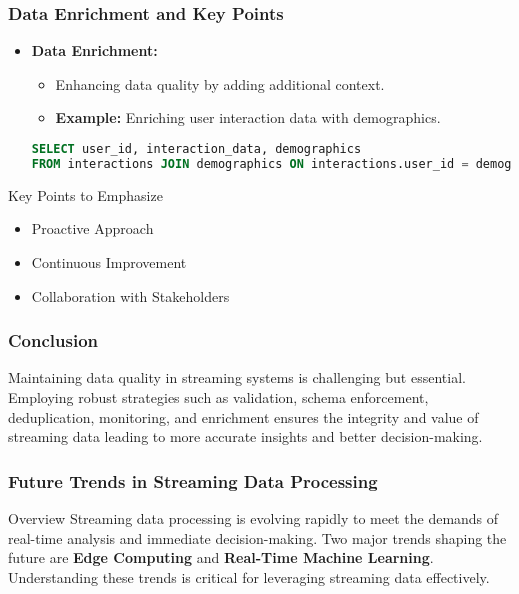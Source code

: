 \documentclass[aspectratio=169]{beamer}
\begin{document}
\begin{frame}[fragile]
    \frametitle{Data Enrichment and Key Points}
    \begin{itemize}
        \item \textbf{Data Enrichment:}
        \begin{itemize}
            \item Enhancing data quality by adding additional context.
            \item \textbf{Example:} Enriching user interaction data with demographics.
        \end{itemize}
        \begin{lstlisting}[language=sql]
SELECT user_id, interaction_data, demographics 
FROM interactions JOIN demographics ON interactions.user_id = demographics.user_id
        \end{lstlisting}
    \end{itemize}
    \begin{block}{Key Points to Emphasize}
        \begin{itemize}
            \item Proactive Approach
            \item Continuous Improvement
            \item Collaboration with Stakeholders
        \end{itemize}
    \end{block}
\end{frame}

\begin{frame}
    \frametitle{Conclusion}
    Maintaining data quality in streaming systems is challenging but essential. 
    Employing robust strategies such as validation, schema enforcement, deduplication, monitoring, and enrichment ensures the integrity and value of streaming data leading to more accurate insights and better decision-making.
\end{frame}

\begin{frame}[fragile]
    \frametitle{Future Trends in Streaming Data Processing}
    \begin{block}{Overview}
        Streaming data processing is evolving rapidly to meet the demands of real-time analysis and immediate decision-making. 
        Two major trends shaping the future are \textbf{Edge Computing} and \textbf{Real-Time Machine Learning}. 
        Understanding these trends is critical for leveraging streaming data effectively.
    \end{block}
\end{frame}
\end{document}
